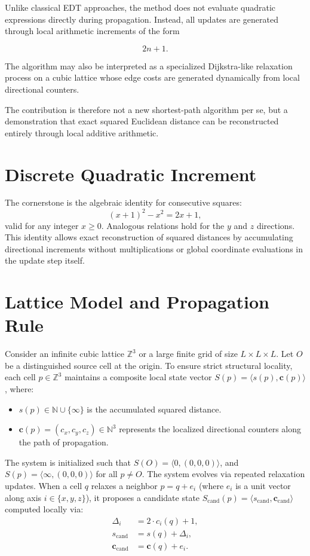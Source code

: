 \documentclass[11pt,a4paper]{article}
\begin{document}
Unlike classical EDT approaches, the method does not evaluate quadratic
expressions directly during propagation. Instead, all updates are generated
through local arithmetic increments of the form

\[
2n+1.
\]

The algorithm may also be interpreted as a specialized Dijkstra-like
relaxation process on a cubic lattice whose edge costs are generated
dynamically from local directional counters.

The contribution is therefore not a new shortest-path algorithm per se,
but a demonstration that exact squared Euclidean distance can be
reconstructed entirely through local additive arithmetic.

\section{Discrete Quadratic Increment}
\label{sec:foundation}

The cornerstone is the algebraic identity for consecutive squares:
\begin{equation}
(x+1)^2 - x^2 = 2x + 1,
\label{eq:increment}
\end{equation}
valid for any integer $x \geq 0$. Analogous relations hold for the $y$ and $z$ directions. This identity allows exact reconstruction of squared distances by accumulating directional increments without multiplications or global coordinate evaluations in the update step itself.

\section{Lattice Model and Propagation Rule}
\label{sec:model}

Consider an infinite cubic lattice $\mathbb{Z}^3$ or a large finite grid of size $L \times L \times L$. Let $O$ be a distinguished source cell at the origin. To ensure strict structural locality, each cell $p \in \mathbb{Z}^3$ maintains a composite local state vector $S(p) = \langle s(p), \mathbf{c}(p) \rangle$, where:
\begin{itemize}
    \item $s(p) \in \mathbb{N} \cup \{\infty\}$ is the accumulated squared distance.
    \item $\mathbf{c}(p) = (c_x, c_y, c_z) \in \mathbb{N}^3$ represents the localized directional counters along the path of propagation.
\end{itemize}

The system is initialized such that $S(O) = \langle 0, (0,0,0) \rangle$, and $S(p) = \langle \infty, (0,0,0) \rangle$ for all $p \neq O$. The system evolves via repeated relaxation updates. When a cell $q$ relaxes a neighbor $p = q + e_i$ (where $e_i$ is a unit vector along axis $i \in \{x, y, z\}$), it proposes a candidate state $S_{\text{cand}}(p) = \langle s_{\text{cand}}, \mathbf{c}_{\text{cand}} \rangle$ computed locally via:
\begin{align}
\Delta_i &= 2 \cdot c_i(q) + 1, \\
s_{\text{cand}} &= s(q) + \Delta_i, \\
\mathbf{c}_{\text{cand}} &= \mathbf{c}(q) + e_i.
\end{align}
\end{document}

